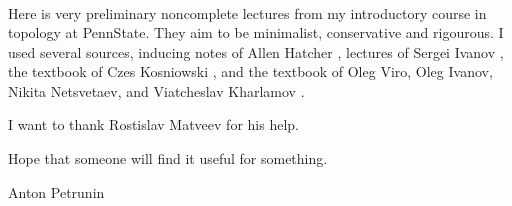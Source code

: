 \title{
\tt \thetitle
}
\author{\tt \theauthors}
\date{}
\maketitle
\thispagestyle{empty}

Here is very preliminary noncomplete lectures from my introductory course in topology at PennState.
They aim to be minimalist, conservative and rigourous.
I used several sources, inducing
notes of Allen Hatcher \cite{hatcher},
lectures of Sergei Ivanov \cite{ivanov},
the textbook of Czes Kosniowski \cite{kosniowski},
and the textbook of Oleg Viro, Oleg Ivanov, Nikita Netsvetaev, and Viatcheslav Kharlamov \cite{viro-ivanov-netsvetaev-kharlamov}.

I want to thank Rostislav Matveev for his help.

Hope that someone will find it useful for something.

\medskip

\begin{flushright}
Anton Petrunin
\end{flushright}
\null\vfill{}

\newpage
